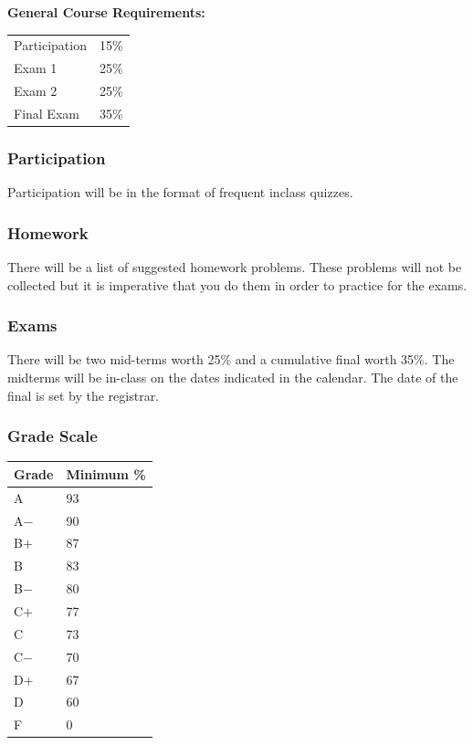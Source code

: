 \documentclass[11pt]{article}
\begin{document}
{\bf General Course Requirements:} 
\begin{center}
{\renewcommand{\arraystretch}{1.2}%
\begin{tabular}{|l|r|}
\hline
Participation & 15\%\\
Exam 1& 25\% \\
Exam 2& 25\% \\
Final Exam& 35\% \\
\hline
\end{tabular}}
\end{center}
\subsubsection*{Participation}
Participation will be in the format of frequent inclass quizzes. 
\subsubsection*{Homework}
There will be a list of suggested homework problems. These problems will not be collected but it is imperative that you do them in order to practice for the exams. 
\subsubsection*{Exams}
There will be two mid-terms worth 25\% and a cumulative final worth 35\%. The midterms will be in-class on the dates indicated in the calendar. The date of the final is set by the registrar. 
\subsubsection*{Grade Scale}
\begin{center}
{\renewcommand{\arraystretch}{1.2}%
\begin{tabular}{|l|l|}
\hline
Grade & Minimum \%\\
\hline
 A& 93\\
 A$-$& 90\\
 B$+$& 87\\
  B& 83\\
 B$-$& 80\\
C$+$& 77\\
 C& 73\\
 C$-$& 70\\
 D$+$& 67\\
 D& 60\\
 F& 0\\
\hline
\end{tabular}}
\end{center}
\end{document}
